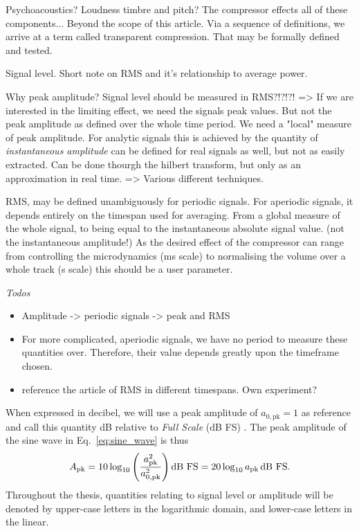 \documentclass[../main2.tex]{subfiles}
\begin{document}
Psychoacoustics? Loudness timbre and pitch? The compressor effects all of these components... Beyond the scope of this article. Via a sequence of definitions, we arrive at a term called transparent compression. That may be formally defined and tested.

Signal level. Short note on RMS and it's relationship to average power.

Why peak amplitude? Signal level should be measured in RMS?!?!?!
=> If we are interested in the limiting effect, we need the signals peak values.
But not the peak amplitude as defined over the whole time period. We need a "local" measure of peak amplitude. For analytic signals this is achieved by the quantity of \emph{instantaneous amplitude} can be defined for real signals as well, but not as easily extracted. Can be done thourgh the hilbert transform, but only as an approximation in real time. => Various different techniques. 

RMS, may be defined unambiguously for periodic signals. For aperiodic signals, it depends entirely on the timespan used for averaging. From a global measure of the whole signal, to being equal to the instantaneous absolute signal value. (not the instantaneous amplitude!) As the desired effect of the compressor can range from controlling the microdynamics (ms scale) to normalising the volume over a whole track (s scale) this should be a user parameter. 

\emph{Todos}
\begin{itemize}
\item Amplitude -> periodic signals -> peak and RMS
\item For more complicated, aperiodic signals, we have no period to measure these quantities over. Therefore, their value depends greatly upon the timeframe chosen.
\item reference the article of RMS in different timespans. Own experiment?
\end{itemize}



When expressed in decibel, we will use a peak amplitude of $a_{0, \text{pk}} = 1$ as reference and call this quantity dB relative to \emph{Full Scale} (dB FS) \cite{XXXX}. The peak amplitude of the sine wave in Eq.~\eqref{eq:sine_wave} is thus
\begin{equation}
A_\text{pk} = 10 \log_{10} \left( \frac{a_\text{pk}^2}{a_{0, \text{pk}}^2} \right) \text{dB FS} = 20 \log_{10} a_\text{pk} \mskip3mu\text{dB FS}.
\end{equation}
Throughout the thesis, quantities relating to signal level or amplitude will be denoted by upper-case letters in the logarithmic domain, and lower-case letters in the linear.
\end{document}
